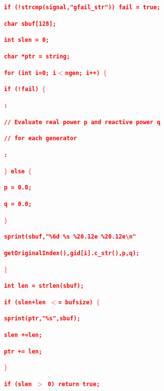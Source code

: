 \documentclass[12pt]{report} %
\begin{document}
\textcolor{red}{\texttt{\textbf{  if (!strcmp(signal,"gfail\_str")) fail = true;}}}

\textcolor{red}{\texttt{\textbf{  char sbuf[128];}}}

\textcolor{red}{\texttt{\textbf{  int slen = 0;  }}}

\textcolor{red}{\texttt{\textbf{  char *ptr = string;  }}}

\textcolor{red}{\texttt{\textbf{  for (int i=0; i$\boldsymbol{\mathrm{<}}$ngen; i++) $\boldsymbol{\mathrm{\{}}$}}}

\textcolor{red}{\texttt{\textbf{    if (!fail) $\boldsymbol{\mathrm{\{}}$}}}

\textcolor{red}{\texttt{\textbf{         :}}}

\textcolor{red}{\texttt{\textbf{      // Evaluate real power p and reactive power q}}}

\textcolor{red}{\texttt{\textbf{      // for each generator}}}

\textcolor{red}{\texttt{\textbf{         :}}}

\textcolor{red}{\texttt{\textbf{    $\boldsymbol{\mathrm{\}}}$ else $\boldsymbol{\mathrm{\{}}$}}}

\textcolor{red}{\texttt{\textbf{      p = 0.0;}}}

\textcolor{red}{\texttt{\textbf{      q = 0.0;}}}

\textcolor{red}{\texttt{\textbf{    $\boldsymbol{\mathrm{\}}}$}}}

\textcolor{red}{\texttt{\textbf{    sprint(sbuf,"\%6d \%s \%20.12e \%20.12e{\textbackslash}n"}}}

\textcolor{red}{\texttt{\textbf{           getOriginalIndex(),gid[i].c\_str(),p,q);}}}

\textcolor{red}{\texttt{\textbf{  $\boldsymbol{\mathrm{\}}}$}}}

\textcolor{red}{\texttt{\textbf{  int len = strlen(sbuf);}}}

\textcolor{red}{\texttt{\textbf{  if (slen+len $\boldsymbol{\mathrm{<}}$= bufsize) $\boldsymbol{\mathrm{\{}}$}}}

\textcolor{red}{\texttt{\textbf{    sprint(ptr,"\%s",sbuf);}}}

\textcolor{red}{\texttt{\textbf{    slen +=len;}}}

\textcolor{red}{\texttt{\textbf{    ptr += len;}}}

\textcolor{red}{\texttt{\textbf{  $\boldsymbol{\mathrm{\}}}$}}}

\textcolor{red}{\texttt{\textbf{  if (slen $\boldsymbol{\mathrm{>}}$ 0) return true;}}}
\end{document}
